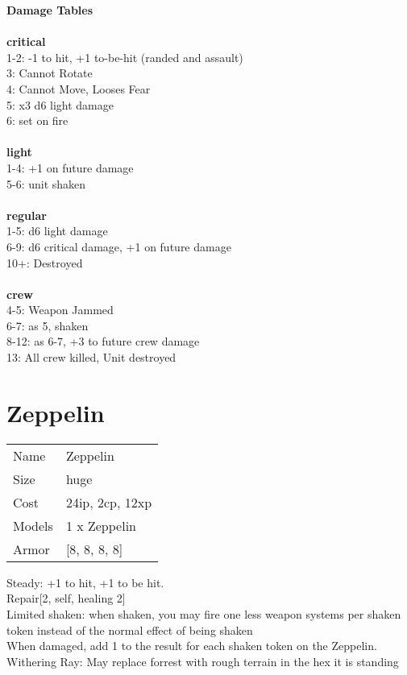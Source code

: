 {\bf Damage Tables} \\
\ \\ {\bf critical } \\
1-2: -1 to hit, +1 to-be-hit (randed and assault) \\
3: Cannot Rotate \\
4: Cannot Move, Looses Fear \\
5: x3 d6 light damage \\
6: set on fire \\
\ \\ {\bf light } \\
1-4: +1 on future damage \\
5-6: unit shaken \\
\ \\ {\bf regular } \\
1-5: d6 light damage \\
6-9: d6 critical damage, +1 on future damage \\
10+: Destroyed \\
\ \\ {\bf crew } \\
4-5: Weapon Jammed \\
6-7: as 5, shaken \\
8-12: as 6-7, +3 to future crew damage \\
13: All crew killed, Unit destroyed \\










\pagebreak\pagebreak

\section{ Zeppelin }

\begin{tabular}{ll}
  Name & Zeppelin \\
  Size & huge\\
  Cost & 24ip, 2cp, 12xp\\
  Models & 1 x Zeppelin\\
  Armor & [8, 8, 8, 8]\\
\end{tabular}

\noindent Steady: +1 to hit, +1 to be hit.\\ 
Repair[2, self, healing 2]\\ 
Limited shaken: when shaken, you may fire one less weapon systems per shaken token instead of the normal effect of being shaken\\ 
 When damaged, add 1 to the result for each shaken token on the Zeppelin.\\ 
Withering Ray: May replace forrest with rough terrain in the hex it is standing\\ 


